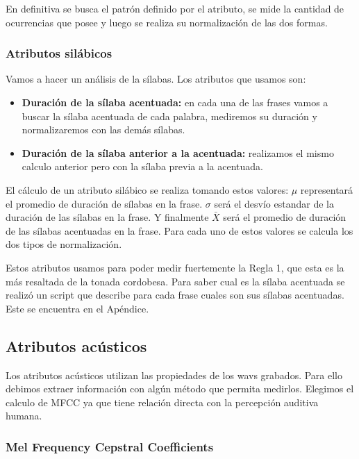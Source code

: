 En definitiva se busca el patrón definido por el atributo, se mide la cantidad de ocurrencias que posee y luego se realiza su normalización de las dos formas. 

\subsubsection{Atributos silábicos}

Vamos a hacer un análisis de la sílabas. Los atributos que usamos son:

\begin{itemize}
    \item \textbf{Duración de la sílaba acentuada:} en cada una de las frases vamos a buscar la sílaba acentuada de cada palabra, mediremos su duración y normalizaremos con las demás sílabas.
    \item \textbf{Duración de la sílaba anterior a la acentuada:} realizamos el mismo calculo anterior pero con la sílaba previa a la acentuada. 
\end{itemize}

El cálculo de un atributo silábico se realiza tomando estos valores: $\mu$ representará el promedio de duración de sílabas en la frase. $\sigma$ será el desvío estandar de la duración de las sílabas en la frase. Y finalmente $\bar{X}$ será el promedio de duración de las sílabas acentuadas en la frase. Para cada uno de estos valores se calcula los dos tipos de normalización.

Estos atributos usamos para poder medir fuertemente la Regla 1, que esta es la más resaltada de la tonada cordobesa. Para saber cual es la sílaba acentuada se realizó un script que describe para cada frase cuales son sus sílabas acentuadas. Este se encuentra en el Apéndice.

\subsection{Atributos acústicos}

Los atributos acústicos utilizan las propiedades de los wavs grabados. Para ello debimos extraer información con algún método que permita medirlos. Elegimos el calculo de MFCC ya que tiene relación directa con la percepción auditiva humana. 

\subsubsection{Mel Frequency Cepstral Coefficients}

